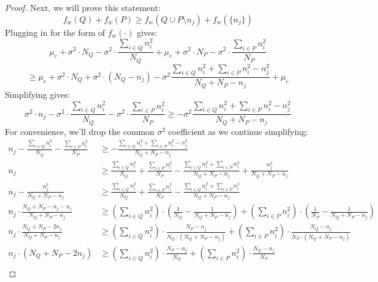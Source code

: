 \documentclass{article}
\newcommand{\p}[1]{\left( #1 \right)}
\newcommand{\cd}[0]{\cdot}
\newcommand{\mue}[0]{\ensuremath{\mu_e}}
\newcommand{\var}[0]{\ensuremath{\sigma^2}}
\newcommand{\ndraw}[0]{\ensuremath{n}}
\newcommand{\total}[0]{\ensuremath{N}}
\newcommand{\costw}[0]{\ensuremath{f_w}}
\begin{document}
\begin{proof}
Next, we will prove this statement: 
$$\costw(Q) + \costw(P) \geq \costw(Q\cup P\setminus \ndraw_j) + \costw(\{\ndraw_j\})$$
Plugging in for the form of $\costw(\cd)$ gives:
$$\mue + \var \cd \total_Q- \var \cd \frac{\sum_{i \in Q} \ndraw_i^2}{\total_Q} + \mue + \var \cd \total_P - \var \cd \frac{\sum_{i \in P}\ndraw_i^2}{\total_P} $$
$$\geq \mue + \var \cd \total_Q + \var \cd (\total_Q - \ndraw_j) - \var \frac{\sum_{i \in Q} \ndraw_i^2 + \sum_{i \in P} \ndraw_i^2 - \ndraw_j^2}{\total_Q + \total_P - \ndraw_j} + \mue$$
Simplifying gives:
$$\var \cd \ndraw_j- \var \cd \frac{\sum_{i \in Q} \ndraw_i^2}{\total_Q}  - \var \cd \frac{\sum_{i \in P}\ndraw_i^2}{\total_P} \geq   - \var \frac{\sum_{i \in Q} \ndraw_i^2 + \sum_{i \in P} \ndraw_i^2 - \ndraw_j^2}{\total_Q + \total_P - \ndraw_j} $$
For convenience, we'll drop the common $\var$ coefficient as we continue simplifying: 
\begin{align*}
\ndraw_j- \frac{\sum_{i \in Q} \ndraw_i^2}{\total_Q}  - \frac{\sum_{i \in P}\ndraw_i^2}{\total_P} &\geq   - \frac{\sum_{i \in Q} \ndraw_i^2 + \sum_{i \in P} \ndraw_i^2 - \ndraw_j^2}{\total_Q + \total_P - \ndraw_j}\\
\ndraw_j &\geq   \frac{\sum_{i \in Q} \ndraw_i^2}{\total_Q}  + \frac{\sum_{i \in P}\ndraw_i^2}{\total_P} - \frac{\sum_{i \in Q} \ndraw_i^2 + \sum_{i \in P} \ndraw_i^2}{\total_Q + \total_P - \ndraw_j}  + \frac{\ndraw_j^2}{\total_Q + \total_P - \ndraw_j}\\
 \ndraw_j-\frac{\ndraw_j^2}{\total_Q + \total_P - \ndraw_j} &\geq   \frac{\sum_{i \in Q} \ndraw_i^2}{\total_Q}  + \frac{\sum_{i \in P}\ndraw_i^2}{\total_P} - \frac{\sum_{i \in Q} \ndraw_i^2 + \sum_{i \in P} \ndraw_i^2}{\total_Q + \total_P - \ndraw_j}\\
 \ndraw_j \cd \frac{\total_Q + \total_P - \ndraw_j - \ndraw_j}{\total_Q + \total_P - \ndraw_j} &\geq  \p{\sum_{i \in Q} \ndraw_i^2} \cd \p{\frac{1}{\total_Q} - \frac{1}{\total_Q + \total_P - \ndraw_j}} + \p{\sum_{i \in P} \ndraw_i^2} \cd \p{\frac{1}{\total_P} - \frac{1}{\total_Q + \total_P - \ndraw_j}}\\
 \ndraw_j \cd \frac{\total_Q + \total_P - 2\ndraw_j}{\total_Q + \total_P - \ndraw_j} &\geq  \p{\sum_{i \in Q} \ndraw_i^2} \cd \frac{\total_P - \ndraw_j}{\total_Q\cd (\total_Q + \total_P - \ndraw_j)} + \p{\sum_{i \in P} \ndraw_i^2} \cd \frac{\total_Q - \ndraw_j}{\total_P\cd (\total_Q + \total_P - \ndraw_j)}\\
 \ndraw_j \cd \p{\total_Q + \total_P - 2\ndraw_j} &\geq  \p{\sum_{i \in Q} \ndraw_i^2} \cd \frac{\total_P - \ndraw_j}{\total_Q} + \p{\sum_{i \in P} \ndraw_i^2} \cd \frac{\total_Q - \ndraw_j}{\total_P}\\

\end{align*}
\end{proof}
\end{document}

